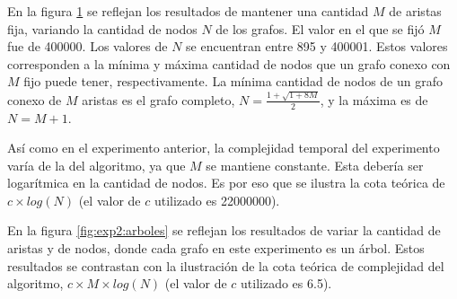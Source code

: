     \renewcommand\constante{22000000}

    En la figura \ref{fig:exp2:m_fijo} se reflejan los resultados de mantener una cantidad $M$ de aristas fija, variando la cantidad de nodos $N$ de los grafos. El valor en el que se fijó $M$ fue de 400000. Los valores de $N$ se encuentran entre 895 y 400001. Estos valores corresponden a la mínima y máxima cantidad de nodos que un grafo conexo con $M$ fijo puede tener, respectivamente. La mínima cantidad de nodos de un grafo conexo de $M$ aristas es el grafo completo, $N = \frac{1 + \sqrt{1 + 8M}}{2}$, y la máxima es de $N = M + 1$.

    Así como en el experimento anterior, la complejidad temporal del experimento varía de la del algoritmo, ya que $M$ se mantiene constante. Esta debería ser logarítmica en la cantidad de nodos. Es por eso que se ilustra la cota teórica de $c \times log(N)$ (el valor de $c$ utilizado es \constante). 
    
    \begin{figure}[H]
        \centering
        \caption{}
        \label{fig:exp2:m_fijo}
    \end{figure}

    \renewcommand\constante{6.5}

    En la figura \ref{fig:exp2:arboles} se reflejan los resultados de variar la cantidad de aristas y de nodos, donde cada grafo en este experimento es un árbol. Estos resultados se contrastan con la ilustración de la cota teórica de complejidad del algoritmo, $c \times M \times log(N)$ (el valor de $c$ utilizado es \constante).

